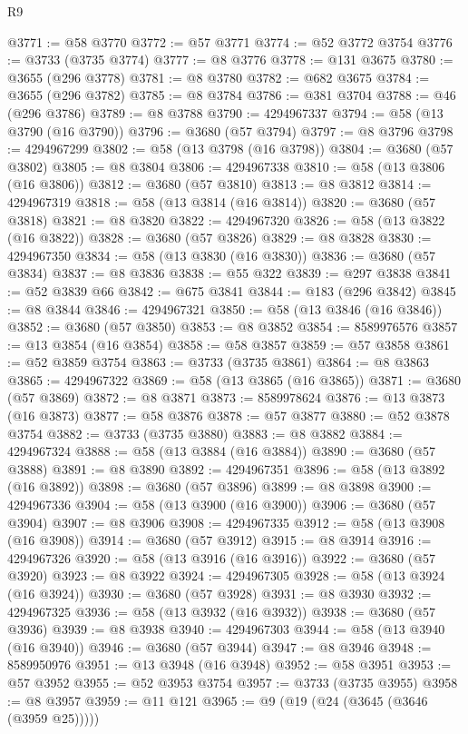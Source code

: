 \begin{lexlean}{R9}
\begin{coremodule}
@3771 := @58 @3770
@3772 := @57 @3771
@3774 := @52 @3772 @3754
@3776 := @3733 (@3735 @3774)
@3777 := @8 @3776
@3778 := @131 @3675
@3780 := @3655 (@296 @3778)
@3781 := @8 @3780
@3782 := @682 @3675
@3784 := @3655 (@296 @3782)
@3785 := @8 @3784
@3786 := @381 @3704
@3788 := @46 (@296 @3786)
@3789 := @8 @3788
@3790 := 4294967337
@3794 := @58 (@13 @3790 (@16 @3790))
@3796 := @3680 (@57 @3794)
@3797 := @8 @3796
@3798 := 4294967299
@3802 := @58 (@13 @3798 (@16 @3798))
@3804 := @3680 (@57 @3802)
@3805 := @8 @3804
@3806 := 4294967338
@3810 := @58 (@13 @3806 (@16 @3806))
@3812 := @3680 (@57 @3810)
@3813 := @8 @3812
@3814 := 4294967319
@3818 := @58 (@13 @3814 (@16 @3814))
@3820 := @3680 (@57 @3818)
@3821 := @8 @3820
@3822 := 4294967320
@3826 := @58 (@13 @3822 (@16 @3822))
@3828 := @3680 (@57 @3826)
@3829 := @8 @3828
@3830 := 4294967350
@3834 := @58 (@13 @3830 (@16 @3830))
@3836 := @3680 (@57 @3834)
@3837 := @8 @3836
@3838 := @55 @322
@3839 := @297 @3838
@3841 := @52 @3839 @66
@3842 := @675 @3841
@3844 := @183 (@296 @3842)
@3845 := @8 @3844
@3846 := 4294967321
@3850 := @58 (@13 @3846 (@16 @3846))
@3852 := @3680 (@57 @3850)
@3853 := @8 @3852
@3854 := 8589976576
@3857 := @13 @3854 (@16 @3854)
@3858 := @58 @3857
@3859 := @57 @3858
@3861 := @52 @3859 @3754
@3863 := @3733 (@3735 @3861)
@3864 := @8 @3863
@3865 := 4294967322
@3869 := @58 (@13 @3865 (@16 @3865))
@3871 := @3680 (@57 @3869)
@3872 := @8 @3871
@3873 := 8589978624
@3876 := @13 @3873 (@16 @3873)
@3877 := @58 @3876
@3878 := @57 @3877
@3880 := @52 @3878 @3754
@3882 := @3733 (@3735 @3880)
@3883 := @8 @3882
@3884 := 4294967324
@3888 := @58 (@13 @3884 (@16 @3884))
@3890 := @3680 (@57 @3888)
@3891 := @8 @3890
@3892 := 4294967351
@3896 := @58 (@13 @3892 (@16 @3892))
@3898 := @3680 (@57 @3896)
@3899 := @8 @3898
@3900 := 4294967336
@3904 := @58 (@13 @3900 (@16 @3900))
@3906 := @3680 (@57 @3904)
@3907 := @8 @3906
@3908 := 4294967335
@3912 := @58 (@13 @3908 (@16 @3908))
@3914 := @3680 (@57 @3912)
@3915 := @8 @3914
@3916 := 4294967326
@3920 := @58 (@13 @3916 (@16 @3916))
@3922 := @3680 (@57 @3920)
@3923 := @8 @3922
@3924 := 4294967305
@3928 := @58 (@13 @3924 (@16 @3924))
@3930 := @3680 (@57 @3928)
@3931 := @8 @3930
@3932 := 4294967325
@3936 := @58 (@13 @3932 (@16 @3932))
@3938 := @3680 (@57 @3936)
@3939 := @8 @3938
@3940 := 4294967303
@3944 := @58 (@13 @3940 (@16 @3940))
@3946 := @3680 (@57 @3944)
@3947 := @8 @3946
@3948 := 8589950976
@3951 := @13 @3948 (@16 @3948)
@3952 := @58 @3951
@3953 := @57 @3952
@3955 := @52 @3953 @3754
@3957 := @3733 (@3735 @3955)
@3958 := @8 @3957
@3959 := @11 @121
@3965 := @9 (@19 (@24 (@3645 (@3646 (@3959 @25)))))

\end{coremodule}
\end{lexlean}
